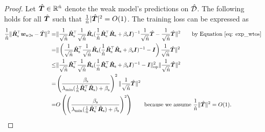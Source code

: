 \begin{proof}

Let $\hat{{\bm{T}}} \in {\mathbb{R}}^{\hat{n}}$ denote the weak model's predictions on $\hat{{\mathcal{D}}}$. The following holds for all $\hat{{\bm{T}}}$ such that $\frac{1}{\hat{n}} |\hat{{\bm{T}}} |^2 = O(1)$. The training loss can be expressed as
\begin{align}
    \nonumber
    \frac{1}{\hat{n}}\| \hat{{\bm{R}}}_{\text{s}}^\top{\bm{w}}_{\text{w2s}} - \hat{{\bm{T}}}   \|^2 = &  \| \frac{1}{\sqrt{\hat{n}}}\hat{{\bm{R}}}_{\text{s}}^\top \frac{1}{\sqrt{\hat{n}}}\hat{{\bm{R}}}_{\text{s}} ( \frac{1}{\hat{n}}\hat{{\bm{R}}}_{\text{s}}^\top \hat{{\bm{R}}}_{\text{s}} +\beta_{\text{s}} {\bm{I}} )^{-1} \frac{1}{\sqrt{\hat{n}}}\hat{{\bm{T}}} - \frac{1}{\sqrt{\hat{n}}}\hat{{\bm{T}}} \|^2 \quad\quad \text{by Equation \ref{eq: exp_wtos}} \\
    \nonumber
    = & \| \left(\frac{1}{\sqrt{\hat{n}}}\hat{{\bm{R}}}_{\text{s}}^\top \frac{1}{\sqrt{\hat{n}}}\hat{{\bm{R}}}_{\text{s}} ( \frac{1}{\hat{n}}\hat{{\bm{R}}}_{\text{s}}^\top \hat{{\bm{R}}}_{\text{s}} +\beta_{\text{s}} {\bm{I}} )^{-1} -{\bm{I}}\right) \frac{1}{\sqrt{\hat{n}}}\hat{{\bm{T}}} \|^2\\
    \nonumber
    \leq & \lVert \frac{1}{\sqrt{\hat{n}}}\hat{{\bm{R}}}_{\text{s}}^\top \frac{1}{\sqrt{\hat{n}}}\hat{{\bm{R}}}_{\text{s}} ( \frac{1}{\hat{n}}\hat{{\bm{R}}}_{\text{s}}^\top \hat{{\bm{R}}}_{\text{s}} +\beta_{\text{s}} {\bm{I}} )^{-1} -{\bm{I}} \rVert_{\mathrm{op}}^2 \| \frac{1}{\sqrt{\hat{n}}}\hat{{\bm{T}}} \|^2\\
    \nonumber
    = & \left(\frac{\beta_{\text{s}}}{\lambda_{\min}(  \frac{1}{\hat{n}}\hat{{\bm{R}}}_{\text{s}}^\top \hat{{\bm{R}}}_{\text{s}} ) +\beta_{\text{s}} }\right)^2  \| \frac{1}{\sqrt{\hat{n}}}\hat{{\bm{T}}} \|^2\\
    \label{eq: training_loss_bound}
     = & O\left(\left(\frac{\beta_{\text{s}}}{\lambda_{\min}(  \frac{1}{\hat{n}}\hat{{\bm{R}}}_{\text{s}}^\top \hat{{\bm{R}}}_{\text{s}} ) +\beta_{\text{s}} }\right)^2 \right) \quad\quad\text{because we assume $ \frac{1}{\hat{n}} \|\hat{{\bm{T}}} \|^2=O(1) $}.  
\end{align}


\end{proof}
